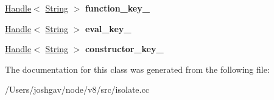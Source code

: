 \begin{DoxyCompactItemize}
\item 
\hyperlink{classv8_1_1internal_1_1_handle}{Handle}$<$ \hyperlink{classv8_1_1internal_1_1_string}{String} $>$ {\bfseries function\+\_\+key\+\_\+}\hypertarget{classv8_1_1internal_1_1_capture_stack_trace_helper_ad97618f4395da44c175e91735b4f3edc}{}\label{classv8_1_1internal_1_1_capture_stack_trace_helper_ad97618f4395da44c175e91735b4f3edc}

\item 
\hyperlink{classv8_1_1internal_1_1_handle}{Handle}$<$ \hyperlink{classv8_1_1internal_1_1_string}{String} $>$ {\bfseries eval\+\_\+key\+\_\+}\hypertarget{classv8_1_1internal_1_1_capture_stack_trace_helper_a6774cf3ff805a85e40cd01fa94058226}{}\label{classv8_1_1internal_1_1_capture_stack_trace_helper_a6774cf3ff805a85e40cd01fa94058226}

\item 
\hyperlink{classv8_1_1internal_1_1_handle}{Handle}$<$ \hyperlink{classv8_1_1internal_1_1_string}{String} $>$ {\bfseries constructor\+\_\+key\+\_\+}\hypertarget{classv8_1_1internal_1_1_capture_stack_trace_helper_a1e643d1f30afe868f20a0e4928d96381}{}\label{classv8_1_1internal_1_1_capture_stack_trace_helper_a1e643d1f30afe868f20a0e4928d96381}

\end{DoxyCompactItemize}


The documentation for this class was generated from the following file\+:\begin{DoxyCompactItemize}
\item 
/\+Users/joshgav/node/v8/src/isolate.\+cc\end{DoxyCompactItemize}
